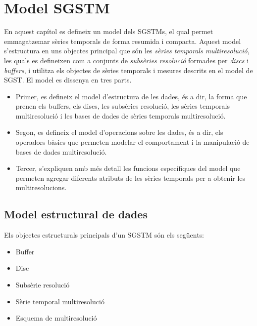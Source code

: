 \chapter{Model SGSTM}
\label{cap:model:sgstm}

En aquest capítol es defineix un model dels \glspl{SGSTM}, el qual permet
emmagatzemar sèries temporals de forma resumida i compacta. Aquest
model s'estructura en uns objectes principal que són les \emph{sèries
  temporals multiresolució}, les quals es defineixen com a conjunts de
\emph{subsèries resolució} formades per \emph{discs} i \emph{buffers},
i utilitza els objectes de sèries temporals i mesures descrits en el
model de \gls{SGST}.  El model es dissenya en tres parts.

\begin{itemize}
\item Primer, es defineix el model d'estructura de les dades, és a
  dir, la forma que prenen els buffers, els discs, les subsèries
  resolució, les sèries temporals multiresolució i les bases de dades
  de sèries temporals multiresolució.

\item Segon, es defineix el model d'operacions sobre les dades, és a
  dir, els operadors bàsics que permeten modelar el comportament i la
  manipulació de bases de dades multiresolució.

\item Tercer, s'expliquen amb més detall les funcions específiques del
  model que permeten agregar diferents atributs de les sèries
  temporals per a obtenir les multiresolucions. 
\end{itemize}




\section{Model estructural de dades}


Els objectes estructurals principals d'un \gls{SGSTM} són els següents:
\begin{itemize}
\item Buffer
\item Disc
\item Subsèrie resolució
\item Sèrie temporal multiresolució
\item Esquema de multiresolució
\end{itemize}

